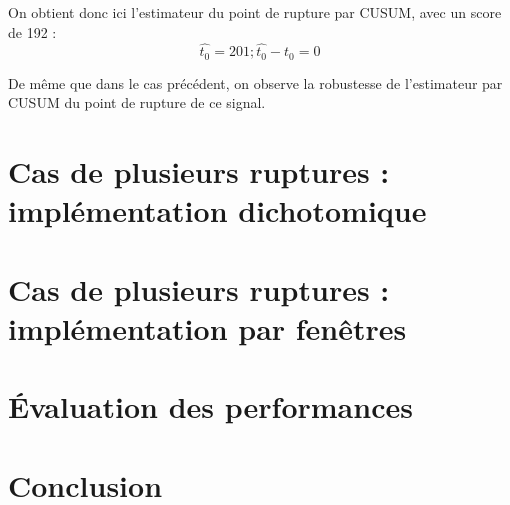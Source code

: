 \documentclass[french,12pt,notitlepage]{report}
\begin{document}
	On obtient donc ici l'estimateur du point de rupture par CUSUM, avec un score de 192 :
	\begin{equation*}
		\hat{t_0} = 201 ; \hat{t_0} - t_0 = 0
	\end{equation*}
	
	De même que dans le cas précédent, on observe la robustesse de l'estimateur par CUSUM du point de rupture de ce signal.
	
	\chapter{Cas de plusieurs ruptures : implémentation dichotomique}
	
	\chapter{Cas de plusieurs ruptures : implémentation par fenêtres}
	
	\chapter{Évaluation des performances}
	
	\chapter{Conclusion}
\end{document}
